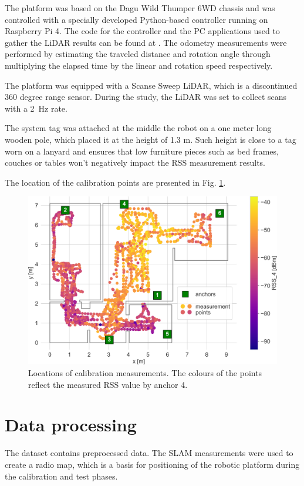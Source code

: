 \documentclass[conference, 11pt, onecolumn]{IEEEtran}
\begin{document}
The platform was based on the Dagu Wild Thumper 6WD chassis and was controlled with a specially developed Python-based controller running on Raspberry Pi 4. The code for the controller and the PC applications used to gather the LiDAR results can be found at \cite{b2}.  The odometry measurements were performed by estimating the traveled distance and rotation angle through multiplying the elapsed time by the linear and rotation speed respectively.

The platform was equipped with a Scanse Sweep LiDAR, which is a discontinued 360 degree range sensor. During the study, the LiDAR was set to collect scans with a 2~Hz rate.

The system tag was attached at the middle the robot on a one meter long wooden pole, which placed it at the height of 1.3 m. Such height is close to a tag worn on a lanyard and ensures that low furniture pieces such as bed frames, couches or tables won't negatively impact the RSS measurement results.

The location of the calibration points are presented in Fig. \ref{fig:calibration}.

\begin{figure}[h]
\centering
\includegraphics[width=.7\columnwidth]{figs/measurement_points.png}
\caption{\label{fig:calibration}Locations of calibration measurements. The colours of the points reflect the measured RSS value by anchor 4.}
\end{figure}

\section{Data processing}
The dataset contains preprocessed data. The SLAM measurements were used to create a radio map, which is a basis for positioning of the robotic platform during the calibration and test phases.
\end{document}

